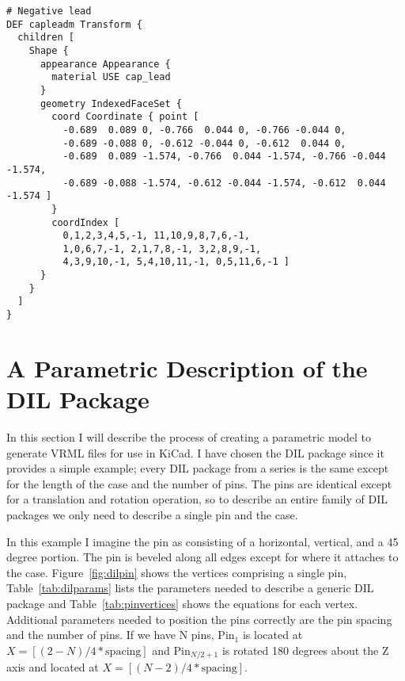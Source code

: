\documentclass[a4paper, dvipdfm]{article}
\begin{document}
\begin{verbatim}
# Negative lead
DEF capleadm Transform {
  children [
    Shape {
      appearance Appearance {
        material USE cap_lead
      }
      geometry IndexedFaceSet {
        coord Coordinate { point [
          -0.689  0.089 0, -0.766  0.044 0, -0.766 -0.044 0,
          -0.689 -0.088 0, -0.612 -0.044 0, -0.612  0.044 0,
          -0.689  0.089 -1.574, -0.766  0.044 -1.574, -0.766 -0.044 -1.574,
          -0.689 -0.088 -1.574, -0.612 -0.044 -1.574, -0.612  0.044 -1.574 ]
        }
        coordIndex [
          0,1,2,3,4,5,-1, 11,10,9,8,7,6,-1,
          1,0,6,7,-1, 2,1,7,8,-1, 3,2,8,9,-1,
          4,3,9,10,-1, 5,4,10,11,-1, 0,5,11,6,-1 ]
      }
    }
  ]
}
\end{verbatim}


\section{A Parametric Description of the DIL Package}
In this section I will describe the process of creating a parametric model to generate
VRML files for use in KiCad.  I have chosen the DIL package since it provides a simple
example; every DIL package from a series is the same except for the length of the case
and the number of pins. The pins are identical except for a translation and rotation
operation, so to describe an entire family of DIL packages we only need to describe a
single pin and the case.

 In this example I imagine the pin as consisting of a horizontal, vertical, and a 45 degree
 portion. The pin is beveled along all edges except for where it attaches to the case.
 Figure~\ref{fig:dilpin} shows the vertices comprising a single pin, Table~\ref{tab:dilparams}
 lists the parameters needed to describe a generic DIL package and Table~\ref{tab:pinvertices}
 shows the equations for each vertex. Additional parameters needed to position the pins
 correctly are the pin spacing and the number of pins. If we have N pins, $\mathrm{Pin}_1$
 is located at $X = [(2-N)/4*\mathrm{spacing}]$ and $\mathrm{Pin}_{N/2+1}$ is rotated 180 degrees
 about the Z axis and located at $X = [(N-2)/4*\mathrm{spacing}]$.
\end{document}
